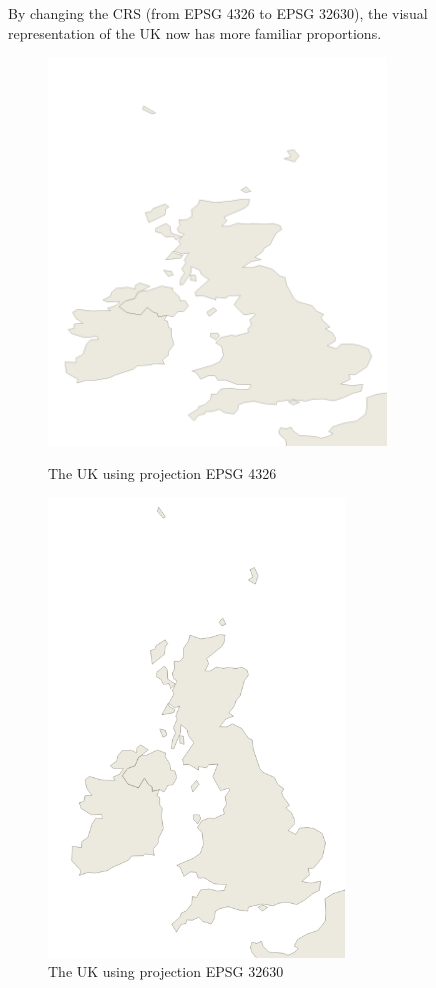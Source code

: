 By changing the CRS (from EPSG 4326 to EPSG 32630), the visual representation of the UK now has more familiar proportions.

\begin{figure}[!h]
	\centering
	\begin{minipage}{0.4\textwidth}
		\centering
		\includegraphics[width=0.8\textwidth]{images/uk_epsg4326.png}%
		\caption{The UK using projection EPSG 4326}
	\end{minipage}\hfill
	\begin{minipage}{0.35\textwidth}
		\centering
		\includegraphics[width=0.7\textwidth]{images/uk_epsg32630.png}%
		\caption{The UK using projection EPSG 32630}
	\end{minipage}
\end{figure}

